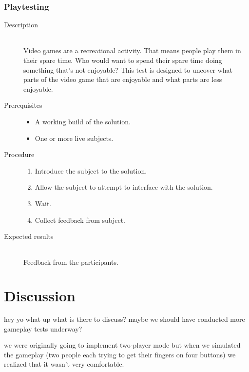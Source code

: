 	\subsubsection{Playtesting}
	\begin{description}
		\item[Description] \hfill \\
			Video games are a recreational activity.
			That means people play them in their spare time.
			Who would want to spend their spare time doing something that's not enjoyable?
			This test is designed to uncover what parts of the video game that are enjoyable and what parts are less enjoyable.
		\item[Prerequisites] \hfill
			\begin{itemize}
				\item{A working build of the solution.}
				\item{One or more live subjects.}
			\end{itemize}
		\item[Procedure] \hfill
			\begin{enumerate}
				\item{Introduce the subject to the solution.}
				\item{Allow the subject to attempt to interface with the solution.}
				\item{Wait.}
				\item{Collect feedback from subject.}
			\end{enumerate}
		\item[Expected results] \hfill \\
			Feedback from the participants.
	\end{description}


\section{Discussion}
	hey yo what up what is there to discuss?
	maybe we should have conducted more gameplay tests underway?

	we were originally going to implement two-player mode but when we simulated the gameplay (two people each trying to get their fingers on four buttons) we realized that it wasn't very comfortable.
